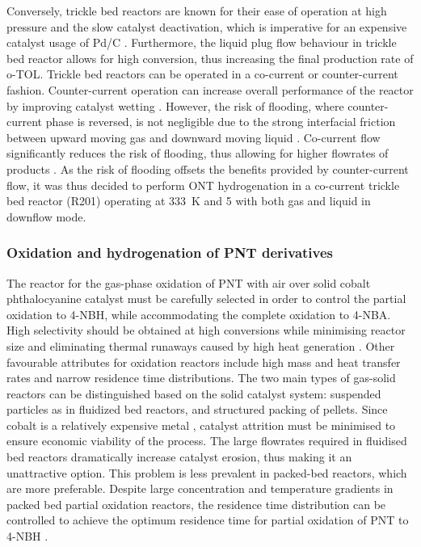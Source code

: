 Conversely, trickle bed reactors are known for their ease of operation at high pressure and the slow catalyst deactivation, which is imperative for an expensive catalyst usage of Pd/C \cite{vemala_hydrodynamic_nodate}. Furthermore, the liquid plug flow behaviour in trickle bed reactor allows for high conversion, thus increasing the final production rate of o-TOL. Trickle bed reactors can be operated in a co-current or counter-current fashion. Counter-current operation can increase overall performance of the reactor by improving catalyst wetting \cite{kundu_novel_2003}. However, the risk of flooding, where counter-current phase is reversed, is not negligible due to the strong interfacial friction between upward moving gas and downward moving liquid \cite{breijer_prevention_2008}. Co-current flow significantly reduces the risk of flooding, thus allowing for higher flowrates of products \cite{vemala_hydrodynamic_nodate}. As the risk of flooding offsets the benefits provided by counter-current flow, it was thus decided to perform ONT hydrogenation in a co-current trickle bed reactor (R201) operating at \SI{333}{\K} and \SI{5}{\atm} with both gas and liquid in downflow mode. 


\subsubsection{Oxidation and hydrogenation of PNT derivatives} \label{sec:synthesis-R3-R4}

The reactor for the gas-phase oxidation of PNT with air over solid cobalt phthalocyanine catalyst must be carefully selected in order to control the partial oxidation to 4-NBH, while accommodating the complete oxidation to 4-NBA. High selectivity should be obtained at high conversions while minimising reactor size and eliminating thermal runaways caused by high heat generation \cite{schmidt_catalytic_1994}. Other favourable attributes for oxidation reactors include high mass and heat transfer rates and narrow residence time distributions. The two main types of gas-solid reactors can be distinguished based on the solid catalyst system: suspended particles as in fluidized bed reactors, and structured packing of pellets. Since cobalt is a relatively expensive metal \cite{saib_fundamental_2014}, catalyst attrition must be minimised to ensure economic viability of the process. The large flowrates required in fluidised bed reactors dramatically increase catalyst erosion, thus making it an unattractive option. This problem is less prevalent in packed-bed reactors, which are more preferable. Despite large concentration and temperature gradients in packed bed partial oxidation reactors, the residence time distribution can be controlled to achieve the optimum residence time for partial oxidation of PNT to 4-NBH \cite{schmidt_catalytic_1994}.

